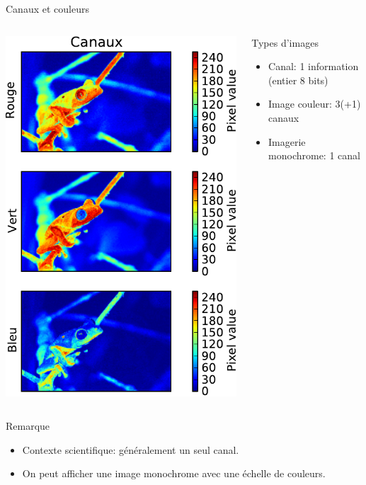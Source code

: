 \documentclass[8pt,a4paper]{beamer}
\begin{document}
\begin{frame}[containsverbatim]{Canaux et couleurs}
  \begin{columns}
  \includegraphics[width=\textwidth]{figures/grenouille_canaux.pdf} 
  
  \begin{block}{Types d'images}
  \begin{itemize}
  \item Canal: 1 information (entier 8 bits)
  \item Image couleur: 3(+1) canaux 
  \item Imagerie monochrome: 1 canal
  \end{itemize}
  \end{block}  
  \end{columns}
  \begin{alertblock}{Remarque}
  \begin{itemize}
  \item Contexte scientifique: généralement un seul canal.
  \item On peut afficher une image monochrome avec une échelle de couleurs.
  \end{itemize}
  
  \end{alertblock}
  
\end{frame}
\end{document}
